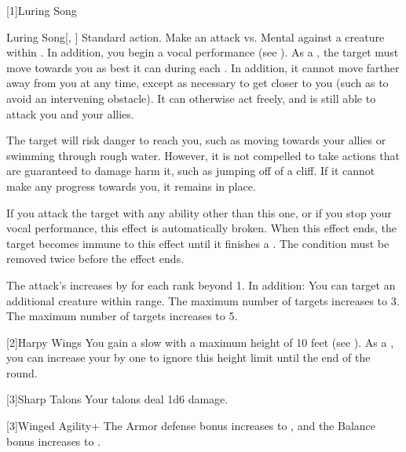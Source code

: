     [1]{Luring Song}
      \begin{magicalactiveability}{Luring Song}[, ]
        \abilityusagetime Standard action.
        \rankline
        Make an attack vs. Mental against a creature within \longrange.
        In addition, you begin a vocal performance (see ).
        \hit As a , the target must move towards you as best it can during each .
        In addition, it cannot move farther away from you at any time, except as necessary to get closer to you (such as to avoid an intervening obstacle).
        It can otherwise act freely, and is still able to attack you and your allies.

        The target will risk danger to reach you, such as moving towards your allies or swimming through rough water.
        However, it is not compelled to take actions that are guaranteed to damage harm it, such as jumping off of a cliff.
        If it cannot make any progress towards you, it remains in place.

        If you attack the target with any ability other than this one, or if you stop your vocal performance, this effect is automatically broken.
        When this effect ends, the target becomes immune to this effect until it finishes a .
        \crit The condition must be removed twice before the effect ends.

        \rankline
        The attack's  increases by  for each rank beyond 1.
        In addition:
         You can target an additional creature within range.
         The maximum number of targets increases to 3.
         The maximum number of targets increases to 5.
      \end{magicalactiveability}

    [2]{Harpy Wings} You gain a slow  with a maximum height of 10 feet (see ).
      As a , you can increase your  by one to ignore this height limit until the end of the round.

    [3]{Sharp Talons} Your talons deal 1d6 damage.

    [3]{Winged Agility+} The Armor defense bonus increases to , and the Balance bonus increases to .

